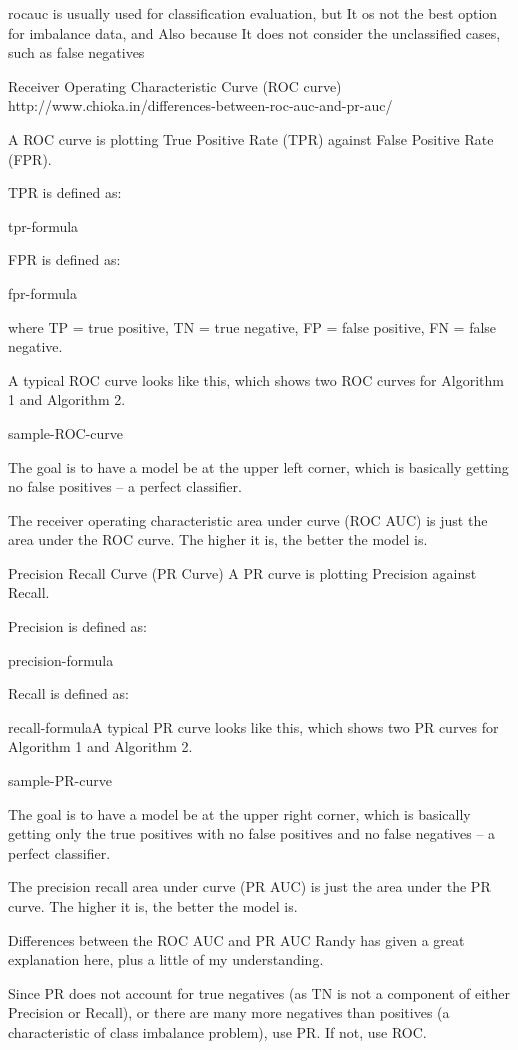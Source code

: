 rocauc is usually used for classification evaluation, but It os not the best option for imbalance data, and Also because It does not consider the unclassified cases, such as false negatives

Receiver Operating Characteristic Curve (ROC curve) http://www.chioka.in/differences-between-roc-auc-and-pr-auc/

A ROC curve is plotting True Positive Rate (TPR) against False Positive Rate (FPR).

TPR is defined as:

tpr-formula

FPR is defined as:

fpr-formula

where TP = true positive, TN = true negative, FP = false positive, FN = false negative.

A typical ROC curve looks like this, which shows two ROC curves for Algorithm 1 and Algorithm 2.

sample-ROC-curve

The goal is to have a model be at the upper left corner, which is basically getting no false positives – a perfect classifier.

The receiver operating characteristic area under curve (ROC AUC) is just the area under the ROC curve. The higher it is, the better the model is.

Precision Recall Curve (PR Curve)
A PR curve is plotting Precision against Recall.

Precision is defined as:

precision-formula

Recall is defined as:

recall-formulaA typical PR curve looks like this, which shows two PR curves for Algorithm 1 and Algorithm 2.

sample-PR-curve

The goal is to have a model be at the upper right corner, which is basically getting only the true positives with no false positives and no false negatives – a perfect classifier.

The precision recall area under curve (PR AUC) is just the area under the PR curve. The higher it is, the better the model is.

Differences between the ROC AUC and PR AUC
Randy has given a great explanation here, plus a little of my understanding.

Since PR does not account for true negatives (as TN is not a component of either Precision or Recall), or there are many more negatives than positives (a characteristic of class imbalance problem), use PR. If not, use ROC.

